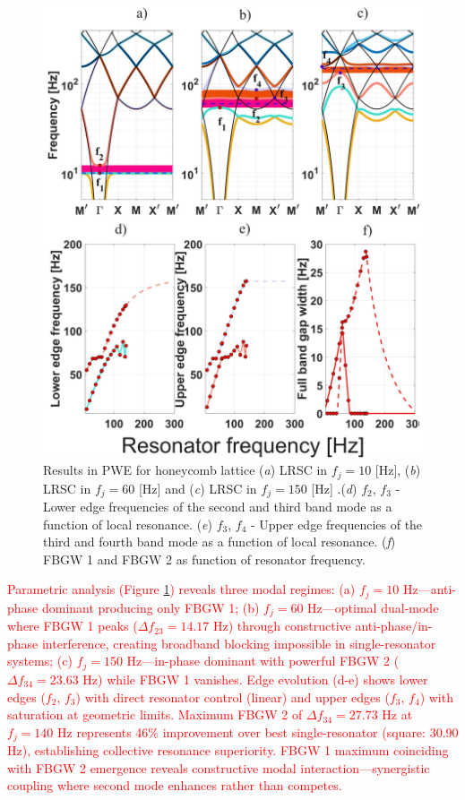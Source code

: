 \documentclass[review,numbers,sort&compress]{elsarticle}
\begin{document}
\newpage
\begin{figure}[htb]
	\centering
	\includegraphics[width=.8\textwidth]{2_4_disp_frf_hex.pdf}
	\caption{Results in PWE for honeycomb lattice (\textit{a}) LRSC in $f_j=10$ [Hz], (\textit{b}) LRSC in $f_j=60$ [Hz] and (\textit{c}) LRSC in $f_j=150$ [Hz] .(\textit{d}) $f_2$, $f_3$ - Lower edge frequencies of the second and third band mode as a function of local resonance. (\textit{e}) $f_3$, $f_4$ - Upper edge frequencies of the third and fourth band mode as a function of local resonance. (\textit{f}) FBGW 1 and FBGW 2 as function of resonator frequency. }
	\label{pwe_disp_hex_all_res12}
\end{figure}

\textcolor{red}{Parametric analysis (Figure \ref{pwe_disp_hex_all_res12}) reveals three modal regimes: (a) $f_j = 10$ Hz---anti-phase dominant producing only FBGW 1; (b) $f_j = 60$ Hz---optimal dual-mode where FBGW 1 peaks ($\Delta f_{23} = 14.17$ Hz) through constructive anti-phase/in-phase interference, creating broadband blocking impossible in single-resonator systems; (c) $f_j = 150$ Hz---in-phase dominant with powerful FBGW 2 ($\Delta f_{34} = 23.63$ Hz) while FBGW 1 vanishes. Edge evolution (d-e) shows lower edges ($f_2$, $f_3$) with direct resonator control (linear) and upper edges ($f_3$, $f_4$) with saturation at geometric limits. Maximum FBGW 2 of $\Delta f_{34} = 27.73$ Hz at $f_j = 140$ Hz represents 46\% improvement over best single-resonator (square: 30.90 Hz), establishing collective resonance superiority. FBGW 1 maximum coinciding with FBGW 2 emergence reveals constructive modal interaction---synergistic coupling where second mode enhances rather than competes.}
\end{document}
